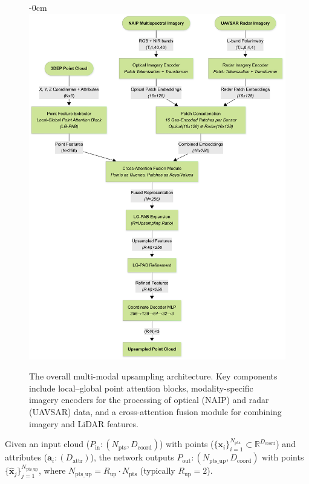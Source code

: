 \documentclass[remotesensing,article,accept,pdftex,moreauthors]{Definitions/mdpi}
\renewcommand{\hl}[1]{#1}
\begin{document}
\begin{figure}[H]
\begin{adjustwidth}{-\extralength}{0cm}
    \centering
    \includegraphics[trim=0mm 0mm 0mm 9mm, clip, width=0.9\linewidth]{figures/Overall_Architecture.png}
    \end{adjustwidth}
    \caption{\hl{The} %
 overall multi-modal upsampling architecture. Key components include local–global point attention blocks, modality-specific imagery encoders for the processing of optical (NAIP) and radar (UAVSAR) data, and a cross-attention fusion module for combining imagery and LiDAR features.}
    \label{fig:pipeline}
\end{figure}


Given an input cloud ($P_{\text{in}}: (N_{\text{pts}}, D_{\text{coord}})$) with \hl{points} %
 ($\{\mathbf{{x}}_i\}_{i=1}^{N_{\text{pts}}}\subset\mathbb{R}^{D_{\text{coord}}}$) and attributes ($\mathbf{a}_i: (D_{\text{attr}})$), the network outputs $P_{\text{out}}: (N_{\text{pts\_up}}, D_{\text{coord}})$ with points $\{\hat{\mathbf{x}}_j\}_{j=1}^{N_{\text{pts\_up}}}$, where $N_{\text{pts\_up}} = R_{\text{up}} \cdot N_{\text{pts}}$ (typically $R_{\text{up}} = 2$).
\end{document}
